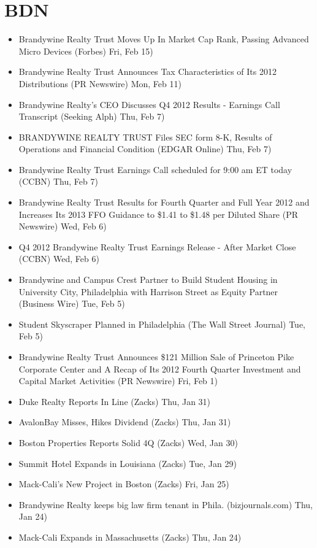 \documentclass[11pt,asymmetric]{article}
\begin{document}
\section*{BDN}
\begin{itemize}
\item Brandywine Realty Trust Moves Up In Market Cap Rank, Passing Advanced Micro Devices (Forbes) Fri, Feb 15)
\item Brandywine Realty Trust Announces Tax Characteristics of Its 2012 Distributions (PR Newswire) Mon, Feb 11)
\item Brandywine Realty's CEO Discusses Q4 2012 Results - Earnings Call Transcript (Seeking Alph) Thu, Feb 7)
\item BRANDYWINE REALTY TRUST Files SEC form 8-K, Results of Operations and Financial Condition (EDGAR Online) Thu, Feb 7)
\item Brandywine Realty Trust Earnings Call scheduled for 9:00 am ET today (CCBN) Thu, Feb 7)
\item Brandywine Realty Trust Results for Fourth Quarter and Full Year 2012 and Increases Its 2013 FFO Guidance to \$1.41 to \$1.48 per Diluted Share (PR Newswire) Wed, Feb 6)
\item Q4 2012 Brandywine Realty Trust Earnings Release - After Market Close (CCBN) Wed, Feb 6)
\item Brandywine and Campus Crest Partner to Build Student Housing in University City, Philadelphia with Harrison Street as Equity Partner (Business Wire) Tue, Feb 5)
\item Student Skyscraper Planned in Philadelphia (The Wall Street Journal) Tue, Feb 5)
\item Brandywine Realty Trust Announces \$121 Million Sale of Princeton Pike Corporate Center and A Recap of Its 2012 Fourth Quarter Investment and Capital Market Activities (PR Newswire) Fri, Feb 1)
\item Duke Realty Reports In Line (Zacks) Thu, Jan 31)
\item AvalonBay Misses, Hikes Dividend (Zacks) Thu, Jan 31)
\item Boston Properties Reports Solid 4Q (Zacks) Wed, Jan 30)
\item Summit Hotel Expands in Louisiana (Zacks) Tue, Jan 29)
\item Mack-Cali's New Project in Boston (Zacks) Fri, Jan 25)
\item Brandywine Realty keeps big law firm tenant in Phila. (bizjournals.com) Thu, Jan 24)
\item Mack-Cali Expands in Massachusetts (Zacks) Thu, Jan 24)

\end{itemize}
\end{document}
